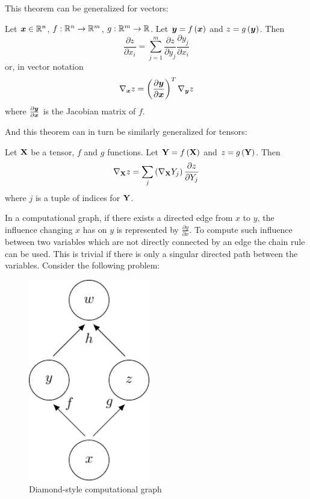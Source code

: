 This theorem can be generalized for vectors:

\begin{theorem}\label{chain_rule_vector}
	Let \( \bm{x} \in \mathbb{R}^n \), \( f : \mathbb{R}^n \to \mathbb{R}^m \), \( g : \mathbb{R}^m \to \mathbb{R} \). Let \( \bm{y} = f \left( \bm{x} \right) \) and \( z = g \left( \bm{y} \right) \). Then
	\[ \frac{\partial z}{\partial x_i} = \sum_{j = 1}^{m} \frac{\partial z}{\partial y_j} \frac{\partial y_j}{\partial x_i} \]
	or, in vector notation
	\[ \nabla_{\bm{x}} z = \left( \frac{\partial \bm{y}}{\partial \bm{x}} \right)^T \nabla_{\bm{y}} z \]
	where \( \frac{\partial \bm{y}}{\partial \bm{x}} \) is the Jacobian matrix of \( f \).
\end{theorem}

And this theorem can in turn be similarly generalized for tensors:

\begin{theorem}
	Let \( \mathbf{X} \) be a tensor, \( f \) and \( g \) functions. Let \( \mathbf{Y} = f \left( \mathbf{X} \right) \) and \( z = g \left( \mathbf{Y} \right) \). Then
	\[ \nabla_{\mathbf{X}} z = \sum_j \left( \nabla_{\mathbf{X}} Y_j \right) \frac{\partial z}{\partial Y_j} \]
	where \( j \) is a tuple of indices for \( \mathbf{Y} \).
\end{theorem}

In a computational graph, if there exists a directed edge from \( x \) to \( y \), the influence changing \( x \) has on \( y \) is represented by \( \frac{\partial y}{\partial x} \). To compute such influence between two variables which are not directly connected by an edge the chain rule can be used. This is trivial if there is only a singular directed path between the variables. Consider the following problem:

\begin{figure}[h]
	\centering
	\includegraphics[width=150pt]{images/diamond/diamond.pdf}
	\caption{Diamond-style computational graph}\label{diamond}
\end{figure}

